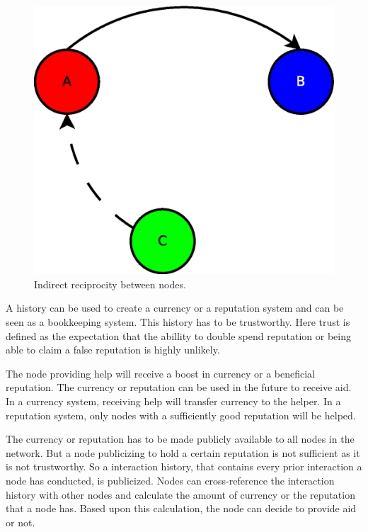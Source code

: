 \begin{figure}
	\centerline{\includegraphics[scale=0.3]{problemDescription/figs/indirect-reciprocity.eps}}
	\caption{Indirect reciprocity between nodes.}
	\label{fig:indirect-reciprocity}
\end{figure}

A history can be used to create a currency or a reputation system
and can be seen as a bookkeeping system.
This history has to be trustworthy.
Here trust is defined as the expectation that the abillity to double spend reputation
or being able to claim a false reputation is highly unlikely.

The node providing help will receive a boost in currency or a beneficial reputation.
The currency or reputation can be used in the future to receive aid.
In a currency system, receiving help will transfer currency to the helper.
In a reputation system, only nodes with a sufficiently good reputation will be helped.

The currency or reputation has to be made publicly available to all nodes in the network.
But a node publicizing to hold a certain reputation is not sufficient as it is not trustworthy.
So a interaction history, that contains every prior interaction a node has conducted, is publicized.
Nodes can cross-reference the interaction history with other nodes and calculate the amount of currency 
or the reputation that a node has.
Based upon this calculation, the node can decide to provide aid or not.

